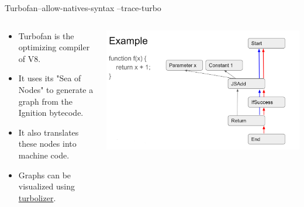 \begin{frame}{Turbofan}{--allow-natives-syntax --trace-turbo}
    \begin{columns}
        \begin{column}{0.33\textwidth}
            \begin{itemize}
                \item Turbofan is the optimizing compiler of V8.
                \item It uses its "Sea of Nodes" to generate a graph from the Ignition bytecode. 
                \item It also translates these nodes into machine code.
                \item Graphs can be visualized using \href{https://chromium.googlesource.com/v8/v8/+/refs/heads/main/tools/turbolizer/}{\color{pink}turbolizer}. 
            \end{itemize}
        \end{column}
        \begin{column}{0.67\textwidth}
            \includegraphics[width=\textwidth]{images/v8-basic-turbo-graph.png}
        \end{column}
    \end{columns}
\end{frame}

